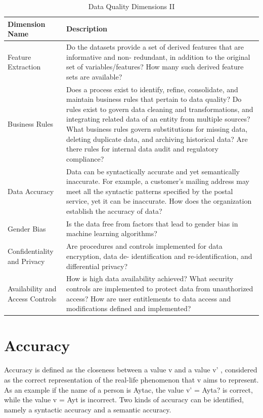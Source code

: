 \begin{table}
\caption{Data Quality Dimensions II}
\centering
\begin{tabular}{p{4.0cm} p{10cm}}
\toprule
\textbf{Dimension Name} & \textbf{Description} \\ 
\bottomrule
	Feature Extraction & 
	Do the datasets provide a set of derived features that are informative and non-
	redundant, in addition to the original set of variables/features? How many such
	derived feature sets are available? 
	\\
	Business Rules & 
	Does a process exist to identify, refine, consolidate, and maintain business
	rules that pertain to data quality? Do rules exist to govern data cleaning and
	transformations, and integrating related data of an entity from multiple sources?
	What business rules govern substitutions for missing data, deleting duplicate data,
	and archiving historical data? Are there rules for internal data audit and regulatory
	compliance? \\
	Data Accuracy & 
	Data can be syntactically accurate and yet semantically inaccurate. For example,
	a customer's mailing address may meet all the syntactic patterns specified by the
	postal service, yet it can be inaccurate. How does the organization establish the
	accuracy of data? \\
	Gender Bias & 
	Is the data free from factors that lead to gender bias in machine learning
	algorithms? \\
	Confidentiality and Privacy & 
	Are procedures and controls implemented for data encryption, data de-
	identification and re-identification, and differential privacy? \\
	Availability and Access Controls & 
	How is high data availability achieved? What security controls are implemented to
	protect data from unauthorized access? How are user entitlements to data access
	and modifications defined and implemented? \\
\bottomrule
\end{tabular}
\end{table}


\section{Accuracy}

Accuracy is defined as the closeness between a value v and a value v' , considered as 
the correct representation of the real-life phenomenon that v aims to
represent. As an example if the name of a person is Aytac, the value v' = Ayta?
is correct, while the value v = Ayt is incorrect. Two kinds of accuracy can be
identified, namely a syntactic accuracy and a semantic accuracy.

